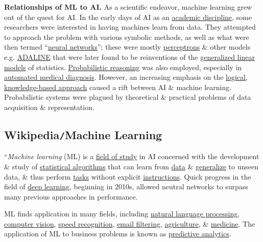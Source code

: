 \documentclass{article}
\begin{document}
{\bf Relationships of ML to AI.} As a scientific endeavor, machine learning grew out of the quest for AI. In the early days of AI as an \href{https://en.wikipedia.org/wiki/Discipline_(academia)}{academic discipline}, some researchers were interested in having machines learn from data. They attempted to approach the problem with various symbolic methods, as well as what were then termed ``\href{https://en.wikipedia.org/wiki/Artificial_neural_network}{neural networks}''; these were mostly \href{https://en.wikipedia.org/wiki/Perceptron}{perceptrons} \& other models e.g. \href{https://en.wikipedia.org/wiki/ADALINE}{ADALINE} that were later found to be reinventions of the \href{https://en.wikipedia.org/wiki/Generalized_linear_model}{generalized linear models} of statistics. \href{https://en.wikipedia.org/wiki/Probabilistic_reasoning}{Probabilistic reasoning} was also employed, especially in \href{https://en.wikipedia.org/wiki/Automated_medical_diagnosis}{automated medical diagnosis}. However, an increasing emphasis on the \href{https://en.wikipedia.org/wiki/Symbolic_AI}{logical, knowledge-based approach} caused a rift between AI \& machine learning. Probabilistic systems were plagued by theoretical \& practical problems of data acquisition \& representation.

\subsection{Wikipedia{\tt/}Machine Learning}
``{\it Machine learning} (ML) is a \href{https://en.wikipedia.org/wiki/Field_of_study}{field of study} in AI concerned with the development \& study of \href{https://en.wikipedia.org/wiki/Computational_statistics}{statistical algorithms} that can learn from \href{https://en.wikipedia.org/wiki/Data}{data} \& \href{https://en.wikipedia.org/wiki/Generalize}{generalize} to unseen data, \& thus perform \href{https://en.wikipedia.org/wiki/Task_(computing)}{tasks} without explicit \href{https://en.wikipedia.org/wiki/Machine_code}{instructions}. Quick progress in the field of \href{https://en.wikipedia.org/wiki/Deep_learning}{deep learning}, beginning in 2010s, allowed neutral networks to surpass many previous approaches in performance.

ML finds application in many fields, including \href{https://en.wikipedia.org/wiki/Natural_language_processing}{natural language processing}, \href{https://en.wikipedia.org/wiki/Computer_vision}{computer vision}, \href{https://en.wikipedia.org/wiki/Speech_recognition}{speed recognition}, \href{https://en.wikipedia.org/wiki/Email_filtering}{email filtering}, \href{https://en.wikipedia.org/wiki/Agriculture}{agriculture}, \& \href{https://en.wikipedia.org/wiki/Medicine}{medicine}. The application of ML to business problems is known as \href{https://en.wikipedia.org/wiki/Predictive_analytics}{predictive analytics}.
\end{document}
